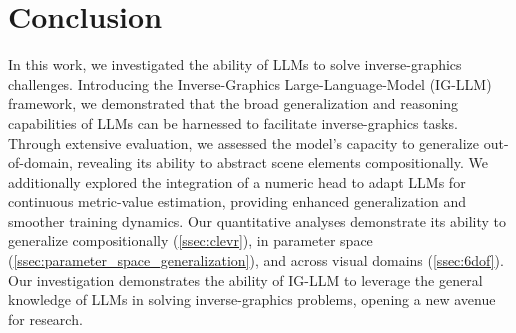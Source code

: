 \section{Conclusion}
In this work, we investigated the ability of LLMs to solve inverse-graphics challenges.
Introducing the Inverse-Graphics Large-Language-Model (IG-LLM) framework, we demonstrated that the broad generalization and reasoning capabilities of LLMs can be harnessed to facilitate inverse-graphics tasks.
Through extensive evaluation, we assessed the model's capacity to generalize out-of-domain, revealing its ability to abstract scene elements compositionally.
We additionally explored the integration of a numeric head to adapt LLMs for continuous metric-value estimation, providing enhanced generalization and smoother training dynamics.
Our quantitative analyses demonstrate its ability to generalize compositionally (\cref{ssec:clevr}), in parameter space (\cref{ssec:parameter_space_generalization}), and across visual domains (\cref{ssec:6dof}).
Our investigation demonstrates the ability of IG-LLM to leverage the general knowledge of LLMs in solving inverse-graphics problems, opening a new avenue for research.